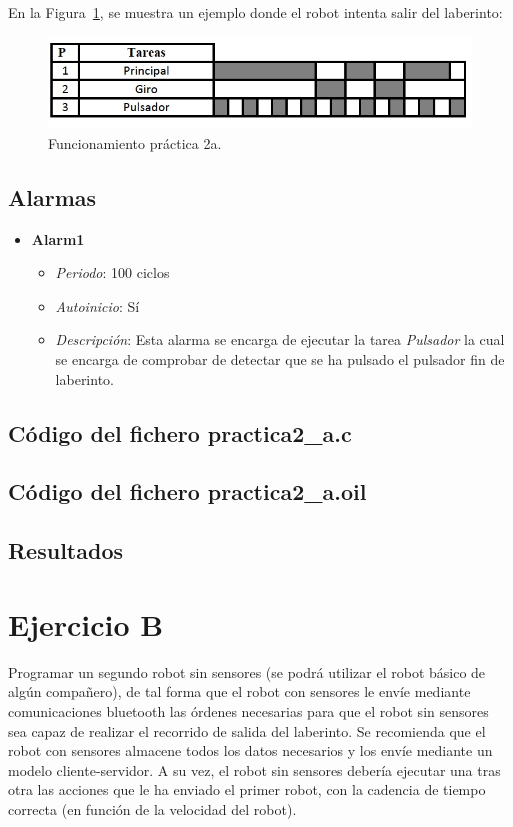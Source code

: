 En la Figura~\ref{grafico2a}, se muestra un ejemplo donde el robot intenta salir del laberinto:

\begin{figure}[H]
 \centering
 \includegraphics[scale=0.5]{./img/grafico2a.jpg}
 \caption{Funcionamiento práctica 2a.}
 \label{grafico2a}
\end{figure}

\subsection{Alarmas}
\begin{itemize}
	\item \textbf{Alarm1}
		\begin{itemize}
			\item \textit{Periodo}: 100 ciclos
			\item \textit{Autoinicio}: Sí
			\item \textit{Descripción}: Esta alarma se encarga de ejecutar la tarea \textit{Pulsador} la cual se encarga de comprobar de detectar que se ha pulsado el pulsador fin de laberinto.
		\end{itemize}
\end{itemize}
\subsection{Código del fichero practica2\_a.c}


\subsection{Código del fichero practica2\_a.oil}


\subsection{Resultados}

\section{Ejercicio B}
Programar un segundo robot sin sensores (se podrá utilizar el robot básico de algún compañero), de tal forma que el robot con sensores le envíe mediante comunicaciones bluetooth las órdenes necesarias 
para que el robot sin sensores sea capaz de realizar el recorrido de salida del laberinto. Se recomienda que el robot con sensores almacene todos los datos necesarios y los envíe mediante un modelo cliente-servidor. A su vez, el robot sin sensores debería ejecutar una tras otra las acciones que le ha enviado el primer robot, con la cadencia de tiempo correcta (en función de la velocidad del robot).
